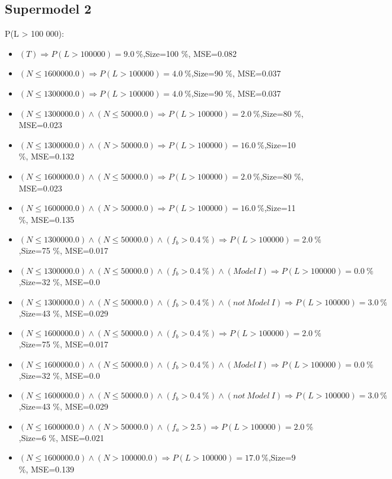 \documentclass[numbered]{CSL}
\begin{document}
\subsection{Supermodel 2}
P(L > 100 000):
\begin{itemize}
\item $(T) \Rightarrow P(L > 100 000) = 9.0~\%$,\hfill Size=100 \%, MSE=0.082
\item $(N \leq 1600000.0) \Rightarrow P(L > 100 000) = 4.0~\%$,\hfill Size=90 \%, MSE=0.037
\item $(N \leq 1300000.0) \Rightarrow P(L > 100 000) = 4.0~\%$,\hfill Size=90 \%, MSE=0.037
\item $(N \leq 1300000.0) \land (N \leq 50000.0) \Rightarrow P(L > 100 000) = 2.0~\%$,\hfill Size=80 \%, MSE=0.023
\item $(N \leq 1300000.0) \land (N > 50000.0) \Rightarrow P(L > 100 000) = 16.0~\%$,\hfill Size=10 \%, MSE=0.132
\item $(N \leq 1600000.0) \land (N \leq 50000.0) \Rightarrow P(L > 100 000) = 2.0~\%$,\hfill Size=80 \%, MSE=0.023
\item $(N \leq 1600000.0) \land (N > 50000.0) \Rightarrow P(L > 100 000) = 16.0~\%$,\hfill Size=11 \%, MSE=0.135
\item $(N \leq 1300000.0) \land (N \leq 50000.0) \land (f_b > 0.4~\%) \Rightarrow P(L > 100 000) = 2.0~\%$,\hfill Size=75 \%, MSE=0.017
\item $(N \leq 1300000.0) \land (N \leq 50000.0) \land (f_b > 0.4~\%) \land (Model~I) \Rightarrow P(L > 100 000) = 0.0~\%$,\hfill Size=32 \%, MSE=0.0
\item $(N \leq 1300000.0) \land (N \leq 50000.0) \land (f_b > 0.4~\%) \land (not~Model~I) \Rightarrow P(L > 100 000) = 3.0~\%$,\hfill Size=43 \%, MSE=0.029
\item $(N \leq 1600000.0) \land (N \leq 50000.0) \land (f_b > 0.4~\%) \Rightarrow P(L > 100 000) = 2.0~\%$,\hfill Size=75 \%, MSE=0.017
\item $(N \leq 1600000.0) \land (N \leq 50000.0) \land (f_b > 0.4~\%) \land (Model~I) \Rightarrow P(L > 100 000) = 0.0~\%$,\hfill Size=32 \%, MSE=0.0
\item $(N \leq 1600000.0) \land (N \leq 50000.0) \land (f_b > 0.4~\%) \land (not~Model~I) \Rightarrow P(L > 100 000) = 3.0~\%$,\hfill Size=43 \%, MSE=0.029
\item $(N \leq 1600000.0) \land (N > 50000.0) \land (f_a > 2.5) \Rightarrow P(L > 100 000) = 2.0~\%$,\hfill Size=6 \%, MSE=0.021
\item $(N \leq 1600000.0) \land (N > 100000.0) \Rightarrow P(L > 100 000) = 17.0~\%$,\hfill Size=9 \%, MSE=0.139

\end{itemize}
\end{document}
